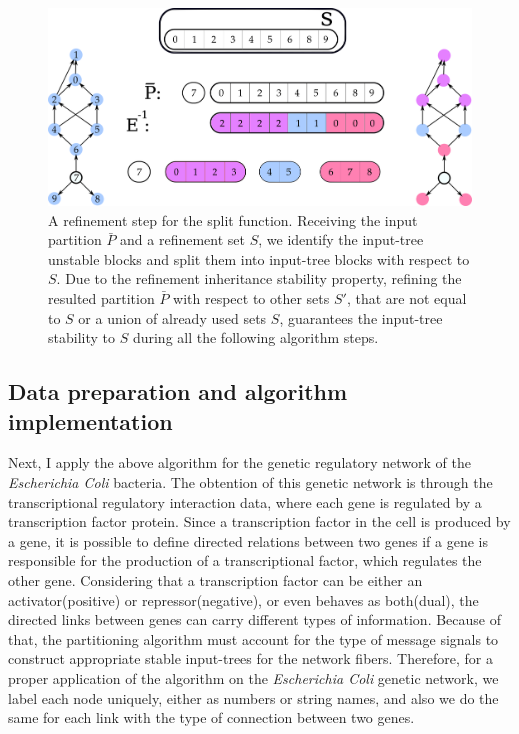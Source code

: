 \documentclass[12pt]{diazessay} %
\begin{document}
\begin{figure}
	\centering
	\includegraphics[scale=0.3]{Figures/test.png}
	\caption{A refinement step for the split function. Receiving the input partition $\bar{P}$ and a refinement set $S$, we identify the input-tree unstable blocks and split them into input-tree blocks with respect to $S$. Due to the refinement inheritance stability property, refining the resulted partition $\bar{P}$ with respect to other sets $S'$, that are not equal to $S$ or a union of already used sets $S$, guarantees the input-tree stability to $S$ during all the following algorithm steps.}
	\label{fig:split}
\end{figure}


\subsection{Data preparation and algorithm implementation}

Next, I apply the above algorithm for the genetic regulatory network of the \textit{Escherichia Coli} bacteria. The obtention of this genetic network is through the transcriptional regulatory interaction data, where each gene is regulated by a transcription factor protein. Since a transcription factor in the cell is produced by a gene, it is possible to define directed relations between two genes if a gene is responsible for the production of a transcriptional factor, which regulates the other gene. Considering that a transcription factor can be either an activator(positive) or repressor(negative), or even behaves as both(dual), the directed links between genes can carry different types of information. Because of that, the partitioning algorithm must account for the type of message signals to construct appropriate stable input-trees for the network fibers. Therefore, for a proper application of the algorithm on the \textit{Escherichia Coli} genetic network, we label each node uniquely, either as numbers or string names, and also we do the same for each link with the type of connection between two genes.
\end{document}
